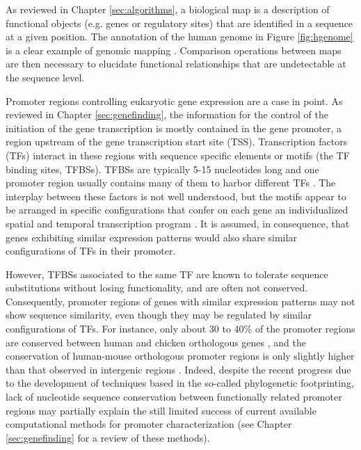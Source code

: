 As reviewed in Chapter \ref{sec:algorithms}, a biological map 
is a description of functional objects (e.g. genes or regulatory sites) that are identified in a 
sequence at a given position. The annotation of the human genome in Figure \ref{fig:hgenome}
 is a clear example of genomic mapping  
\citep{venter:2001a}. Comparison operations between maps are 
then necessary to elucidate functional relationships that are undetectable at the sequence level.

Promoter regions controlling eukaryotic gene expression are a case in
point. As reviewed in Chapter \ref{sec:genefinding}, the information for the control of the 
initiation of the gene transcription is mostly contained in the gene promoter, a region 
upstream of the gene transcription start site (TSS). Transcription factors
(TFs) interact in these regions with sequence specific elements or motifs 
(the TF binding sites, TFBSs). TFBSs are typically 5-15 nucleotides long and 
one promoter region usually contains many of them to harbor different TFs 
\citep{wray:2003a}. The interplay between these factors is not well understood, but the motifs 
appear to be arranged in specific configurations that confer on each gene an individualized
spatial and temporal transcription program \citep{wray:2003a}. It is
assumed, in consequence, that genes exhibiting similar expression
patterns would also share similar configurations of TFs in their
promoter.

However, TFBSs associated to the same TF are known to tolerate
sequence substitutions without losing functionality, and are often not
conserved.  Consequently, promoter regions of genes with similar
expression patterns may not show sequence similarity, even though they
may be regulated by similar configurations of TFs. For instance, only
about 30 to 40\% of the promoter regions are conserved between human
and chicken orthologous genes \citep{hillier:2004a}, and the
conservation of human-mouse orthologous promoter regions is only
slightly higher than that observed in intergenic regions
\citep{waterston:2002a}. Indeed, despite the recent progress due to the
development of techniques based in the so-called phylogenetic
footprinting, lack of nucleotide sequence conservation between functionally 
related promoter regions may partially explain the still limited success of 
current available computational methods for promoter characterization 
(see Chapter \ref{sec:genefinding} for a review of these methods).

